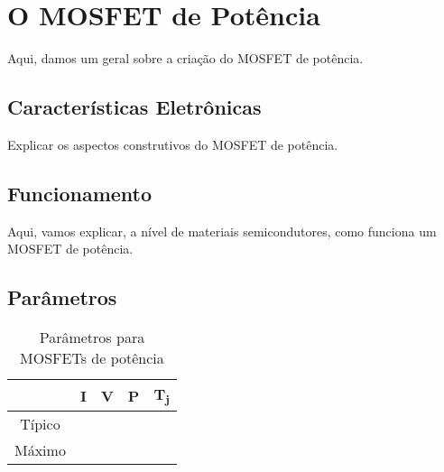 \documentclass[portugues]{./ppgccufmg}
\begin{document}
	\chapter{O MOSFET de Potência}
			Aqui, damos um geral sobre a criação do MOSFET de potência.

		\section{Características Eletrônicas}
			Explicar os aspectos construtivos do MOSFET de potência.

		\section{Funcionamento}
			Aqui, vamos explicar, a nível de materiais semicondutores, como funciona um MOSFET de potência.

		\section{Parâmetros}

			\begin{table}[ht]
				\centering
				\begin{tabular}{|c|c|c|c|c|}
				\hline
								& I & V & P & T\textsubscript{j} \\ \hline
				Típico	&   &   &   &										 \\ \hline
				Máximo	&   &   &   &										 \\ \hline
				\end{tabular}
				\caption{Parâmetros para MOSFETs de potência}
				\label{tab:mosfet_potencia_param}
			\end{table}

		\renewcommand\bibname{Referências}
		
		
		
\end{document}
